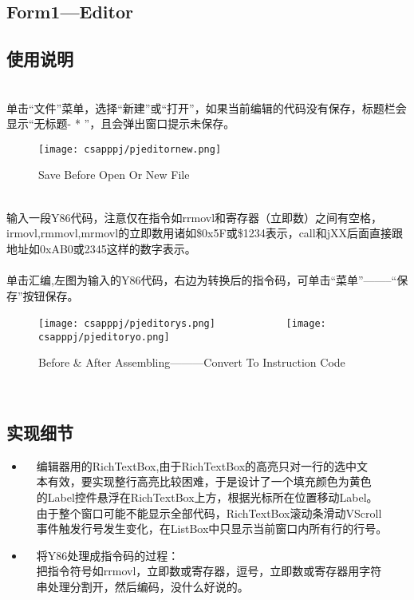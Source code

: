 \documentclass{article}
\begin{document}
\begin{spacing}{1.5}
\section{Form1---Editor}
\subsection{使用说明}
\noindent
{}
\setlength{\hangindent}{3.0em}
\begin{normalsize}
\\
单击“文件”菜单，选择“新建”或“打开”，如果当前编辑的代码没有保存，标题栏会显示“无标题- * ”，且会弹出窗口提示未保存。
\begin{figure}[htbp]
\centering
\texttt{[image: csapppj/pjeditornew.png]}
\caption{Save Before Open Or New File}
\end{figure}
\\
输入一段Y86代码，注意仅在指令如rrmovl和寄存器（立即数）之间有空格，irmovl,rmmovl,mrmovl的立即数用诸如\$0x5F或\$1234表示，call和jXX后面直接跟地址如0xAB0或2345这样的数字表示。\\\\
单击汇编,左图为输入的Y86代码，右边为转换后的指令码，可单击“菜单”--------“保存”按钮保存。
\begin{figure}[htbp]
\centering
\texttt{[image: csapppj/pjeditorys.png]}
\ \ \ \ \ \ \ \ \ \ \ \ 
\texttt{[image: csapppj/pjeditoryo.png]}
\caption{Before \& After Assembling---------Convert To Instruction Code}
\end{figure}

\\

\end{normalsize}

\subsection{实现细节}
\noindent
{}
\setlength{\hangindent}{8.0em}
\begin{normalsize}
\begin{itemize}

\item
\ \
编辑器用的RichTextBox,由于RichTextBox的高亮只对一行的选中文\\
\indent \ \ 本有效，要实现整行高亮比较困难，于是设计了一个填充颜色为黄色\\
\indent \ \ 的Label控件悬浮在RichTextBox上方，根据光标所在位置移动Label。\\
\indent \ \ 由于整个窗口可能不能显示全部代码，RichTextBox滚动条滑动VScroll\\
\indent \ \ 事件触发行号发生变化，在ListBox中只显示当前窗口内所有行的行号。
\item
\ \
将Y86处理成指令码的过程：\\
\indent \ \ 
把指令符号如rrmovl，立即数或寄存器，逗号，立即数或寄存器用字符\\
\indent \ \ 串处理分割开，然后编码，没什么好说的。
\end{itemize}
\end{normalsize}

\end{spacing}
\end{document}
